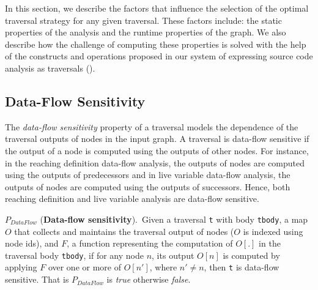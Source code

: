 In this section, we describe the factors that influence the selection of the
optimal traversal strategy for any given traversal. These factors include: the
static properties of the analysis and the runtime properties of the graph. We
also describe how the challenge of computing these properties is solved with the
help of the constructs and operations proposed in our system of expressing
source code analysis as traversals ().
% 
% 

\subsection{Data-Flow Sensitivity}
The {\em data-flow sensitivity} property of a traversal models the dependence of
the traversal outputs of nodes in the input graph. A traversal is data-flow
sensitive if the output of a node is computed using the outputs of other
nodes. For instance, in the reaching definition data-flow analysis, the outputs
of nodes are computed using the outputs of predecessors and in live variable
data-flow analysis, the outputs of nodes are computed using the outputs of
successors. Hence, both reaching definition and live variable analysis are
data-flow sensitive.


\begin{definition}\label{def:dataflow}
$P_{DataFlow}$ (\textbf{Data-flow sensitivity}).\ Given a traversal
\lstinline|t| with body \lstinline|tbody|, a map $O$ that collects and maintains
the traversal output of nodes ($O$ is indexed using node ids), and $F$, a
function representing the computation of $O[.]$ in the traversal body
\lstinline|tbody|, if for any node $n$, its output $O[n]$ is computed by
applying $F$ over one or more of $O[n']$, where $n' \neq n$, then \lstinline|t|
is data-flow sensitive. That is $P_{DataFlow}$ is \textit{true} otherwise
\textit{false}.
\end{definition}
% 

